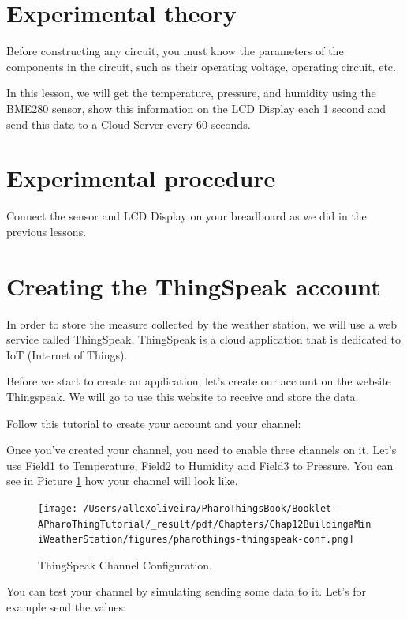 \documentclass[10pt,twoside,english]{_support/latex/sbabook/sbabook}
\begin{document}
\section{Experimental theory}
Before constructing any circuit, you must know the parameters of the components in the circuit, such as their operating voltage, operating circuit, etc.

In this lesson, we will get the temperature, pressure, and humidity using the BME280 sensor, show this information on the LCD Display each 1 second and send this data to a Cloud Server every 60 seconds. 
\section{Experimental procedure}
Connect the sensor and LCD Display on your breadboard as we did in the previous lessons. 
\section{Creating the ThingSpeak account }
In order to store the measure collected by the weather station, we will use a web service called ThingSpeak. ThingSpeak is a cloud application that is dedicated to IoT (Internet of Things).

Before we start to create an application, let's create our account on the website Thingspeak. We will go to use this website to receive and store the data.

Follow this tutorial to create your account and your channel:


Once you've created your channel, you need to enable three channels on it. Let's use Field1 to Temperature, Field2 to Humidity and Field3 to Pressure. You can see in Picture \ref{ThingspeakChannelConf} how your channel will look like.


\begin{figure}

\begin{center}
\texttt{[image: /Users/allexoliveira/PharoThingsBook/Booklet-APharoThingTutorial/\_result/pdf/Chapters/Chap12BuildingaMiniWeatherStation/figures/pharothings-thingspeak-conf.png]}\caption{ThingSpeak Channel Configuration.\label{ThingspeakChannelConf}}\end{center}
\end{figure}


You can test your channel by simulating sending some data to it. Let's for example send the values:
\end{document}

